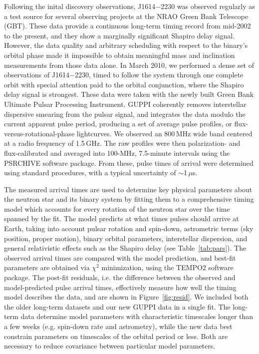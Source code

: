 \documentclass[12pt]{article}
\begin{document}
Following the inital discovery observations, J1614$-$2230 was observed
regularly as a test source for several observing projects at the NRAO
Green Bank Telescope (GBT)\cite{rrh+10}.  These data provide a continuous long-term timing
record from mid-2002 to the present, and they show a marginally
significant Shapiro delay signal.  However, the data quality and
arbitrary scheduling with respect to the binary's orbital phase made it
impossible to obtain meaningful mass and inclination measurements from
those data alone.  In March 2010, we performed a dense set of
observations of J1614$-$2230, timed to follow the system through one
complete orbit with special attention paid to the orbital conjunction,
where the Shapiro delay signal is strongest.  These data were taken with
the newly built Green Bank Ultimate Pulsar Processing
Instrument\cite{guppi}.  GUPPI coherently removes interstellar
dispersive smearing from the pulsar signal, and integrates the data
modulo the current apparent pulse period, producing a set of average
pulse profiles, or flux-versus-rotational-phase lightcurves.  We
observed an 800\,MHz wide band centered at a radio frequency of
1.5\,GHz.  The raw profiles were then polarization- and flux-calibrated
and averaged into 100-MHz, 7.5-minute intervals using the PSRCHIVE
software package\cite{psrchive}.  From these, pulse times of arrival
were determined using standard procedures, with a typical uncertainty of
$\sim$1\,$\mu$s.

The measured arrival times are used to determine key physical parameters
about the neutron star and its binary system by fitting them to a
comprehensive timing model which accounts for every rotation of the
neutron star over the time spanned by the fit.  The model predicts at
what times pulses should arrive at Earth, taking into account pulsar
rotation and spin-down, astrometric terms (sky position, proper motion),
binary orbital parameters, interstellar dispersion, and general
relativistic effects such as the Shapiro delay (see
Table~\ref{tab:pars}).  The observed arrival times are compared with the
model prediction, and best-fit parameters are obtained via $\chi^2$
minimization, using the TEMPO2 software
package\cite{tempo2}.  The post-fit residuals,
i.e. the difference between the observed and model-predicted pulse
arrival times, effectively measure how well the timing model describes
the data, and are shown in Figure~\ref{fig:resid}.  We included both the
older long-term datasets and our new GUPPI data in a single fit.  The
long-term data determine model parameters with characteristic timescales
longer than a few weeks (e.g. spin-down rate and astrometry), while the
new data best constrain parameters on timescales of the orbital period
or less.  Both are necessary to reduce covariance between particular
model parameters.  
\end{document}
